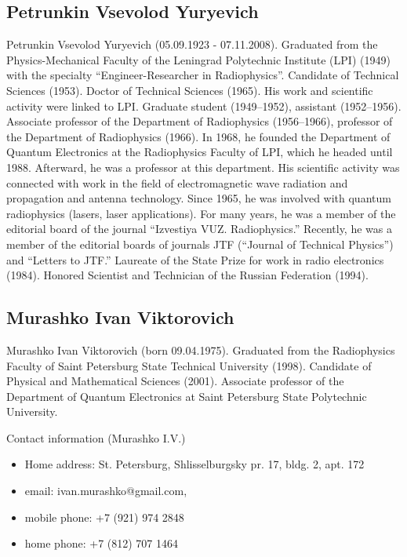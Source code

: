 \subsection{Petrunkin Vsevolod Yuryevich}
Petrunkin Vsevolod Yuryevich (05.09.1923 - 07.11.2008). Graduated from the Physics-Mechanical Faculty of the Leningrad Polytechnic Institute (LPI) (1949) with the specialty ``Engineer-Researcher in Radiophysics''. Candidate of Technical Sciences (1953). Doctor of Technical Sciences (1965). His work and scientific activity were linked to LPI. Graduate student (1949–1952), assistant (1952–1956). Associate professor of the Department of Radiophysics (1956–1966), professor of the Department of Radiophysics (1966). In 1968, he founded the Department of Quantum Electronics at the Radiophysics Faculty of LPI, which he headed until 1988. Afterward, he was a professor at this department. His scientific activity was connected with work in the field of electromagnetic wave radiation and propagation and antenna technology. Since 1965, he was involved with quantum radiophysics (lasers, laser applications). For many years, he was a member of the editorial board of the journal ``Izvestiya VUZ. Radiophysics.'' Recently, he was a member of the editorial boards of journals JTF (``Journal of Technical Physics'') and ``Letters to JTF.'' Laureate of the State Prize for work in radio electronics (1984). Honored Scientist and Technician of the Russian Federation (1994). 
\subsection{Murashko Ivan Viktorovich} 
Murashko Ivan Viktorovich (born 09.04.1975). Graduated from the Radiophysics Faculty of Saint Petersburg State Technical University (1998). Candidate of Physical and Mathematical Sciences (2001). Associate professor of the Department of Quantum Electronics at Saint Petersburg State Polytechnic University.

Contact information (Murashko I.V.) 
\begin{itemize}
\item Home address: St. Petersburg, Shlisselburgsky pr. 17, bldg. 2, apt. 172
\item email: ivan.murashko@gmail.com,
\item mobile phone: +7 (921) 974 2848
\item home phone: +7 (812) 707 1464
\end{itemize}
